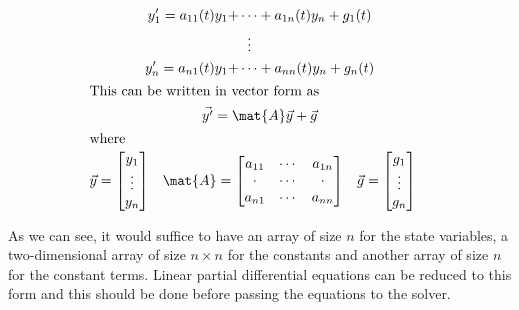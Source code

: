 \documentclass[\rootfolder/main.tex]{subfiles}
\begin{document}
\begin{gather}
  \begin{aligned}
    y'_{1} = a_{11}(t)y_{1} + &\cdots + a_{1n}(t)y_{n} + g_{1}(t)   \\
                              &\vdotswithin{\cdots}                 \\
    y'_{n} = a_{n1}(t)y_{1} + &\cdots + a_{nn}(t)y_{n} + g_{n}(t)
  \end{aligned}\\
  \intertext{This can be written in vector form as}
  \begin{split}
    \vec{y'} = \mat{A}\vec{y} + \vec{g} \\
  \end{split}\\
  \shortintertext{where}
  \begin{split} \nonumber
    \begin{aligned}
      \vec{y} &=
      \begin{bmatrix}
        y_{1}  \\
        \vdots \\
        y_{n}
      \end{bmatrix}
    \end{aligned}
    \begin{aligned}
      \mat{A} &=
      \begin{bmatrix}
        a_{11} & \cdots & a_{1n} \\
        \cdot  & \cdots & \cdot  \\
        a_{n1} & \cdots & a_{nn}
      \end{bmatrix}
    \end{aligned}
    \begin{aligned}
      \vec{g} &=
      \begin{bmatrix}
        g_{1}  \\
        \vdots \\
        g_{n}
      \end{bmatrix}
    \end{aligned}
  \end{split}
\end{gather}

As we can see, it would suffice to have an array of size $n$ for the state variables,
a two-dimensional array of size $n \times n$ for the constants and another array of size $n$ for the constant terms.
Linear partial differential equations can be reduced to this form and this should be done before passing the equations to the solver.
\end{document}
